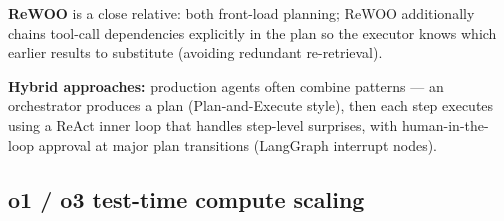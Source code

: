 \textbf{ReWOO} is a close relative: both front-load planning; ReWOO additionally
chains tool-call dependencies explicitly in the plan so the executor knows which
earlier results to substitute (avoiding redundant re-retrieval).

\textbf{Hybrid approaches:} production agents often combine patterns --- an
orchestrator produces a plan (Plan-and-Execute style), then each step executes
using a ReAct inner loop that handles step-level surprises, with human-in-the-loop
approval at major plan transitions (LangGraph interrupt nodes).

\subsection{o1 / o3 test-time compute scaling}


